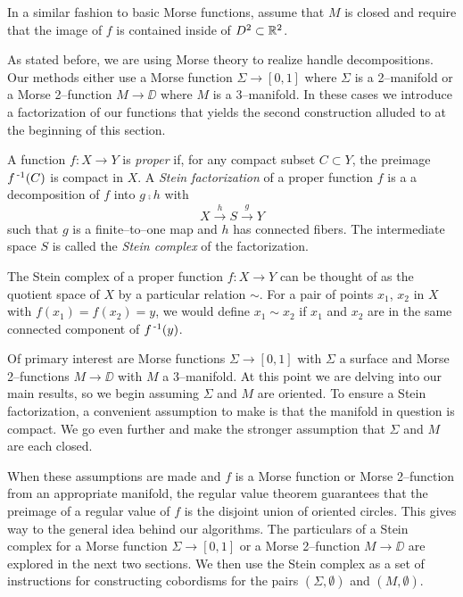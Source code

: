 In a similar fashion to basic Morse functions, assume that $M$ is closed and require that the image of $f$ is contained inside of $D^2\subset\mathbb{R}^2$.

As stated before, we are using Morse theory to realize handle decompositions.
Our methods either use a Morse function $\Sigma\to[0,1]$ where $\Sigma$ is a 2--manifold or a Morse 2--function $M\to\DD$ where $M$ is a 3--manifold.
In these cases we introduce a factorization of our functions that yields the second construction alluded to at the beginning of this section.

\begin{defn}
	\label{def:stein}
	A function $f:X\to Y$ is \emph{proper} if, for any compact subset $C\subset Y$, the preimage $f^{\,\text{-}1}(C)$ is compact in $X$.
	A \emph{Stein factorization} of a proper function $f$ is a a decomposition of $f$ into $g\comp h$ with $$X\overset{h}{\to} S \overset{g}{\to} Y$$ such that $g$ is a finite--to--one map and $h$ has connected fibers.
	The intermediate space $S$ is called the \emph{Stein complex} of the factorization.
\end{defn}

The Stein complex of a proper function $f:X\to Y$ can be thought of as the quotient space of $X$ by a particular relation $\sim$.
For a pair of points $x_1$, $x_2$ in $X$ with $f(x_1)=f(x_2)=y$, we would define $x_1\sim x_2$ if $x_1$ and $x_2$ are in the same connected component of $f^{\,\text{-}1}(y)$.

Of primary interest are Morse functions $\Sigma\to[0,1]$ with $\Sigma$ a surface and Morse 2--functions $M\to\DD$ with $M$ a 3--manifold.
At this point we are delving into our main results, so we begin assuming $\Sigma$ and $M$ are oriented.
To ensure a Stein factorization, a convenient assumption to make is that the manifold in question is compact.
We go even further and make the stronger assumption that $\Sigma$ and $M$ are each closed.

When these assumptions are made and $f$ is a Morse function or Morse 2--function from an appropriate manifold, the regular value theorem guarantees that the preimage of a regular value of $f$ is the disjoint union of oriented circles.
This gives way to the general idea behind our algorithms.
The particulars of a Stein complex for a Morse function $\Sigma\to[0,1]$ or a Morse 2--function $M\to\DD$ are explored in the next two sections.
We then use the Stein complex as a set of instructions for constructing cobordisms for the pairs $(\Sigma,\emptyset)$ and $(M,\emptyset)$.
